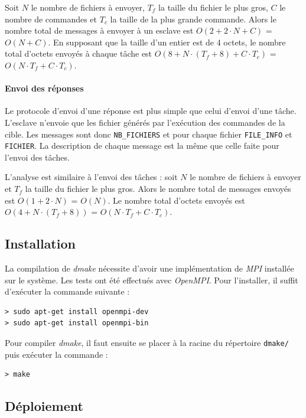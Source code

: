 \documentclass[a4paper,12pt,twoside]{article}
\begin{document}
Soit \texttt{$N$} le nombre de fichiers à envoyer, \texttt{$T_f$} la
taille du fichier le plus gros, \texttt{$C$} le nombre de commandes et
\texttt{$T_c$} la taille de la plus grande commande. Alors le nombre
total de messages à envoyer à un esclave est \texttt{$O(2 + 2 \cdot N
  + C)$} = \texttt{$O(N + C)$}. En supposant que la taille d'un entier
est de 4 octets, le nombre total d'octets envoyés à chaque tâche est
\texttt{$O(8 + N \cdot (T_f+8) + C \cdot T_c)$} = \texttt{$O(N \cdot
  T_f + C \cdot T_c)$}. 

\paragraph{Envoi des réponses}
Le protocole d'envoi d'une réponse est plus simple que celui d'envoi
d'une tâche. L'esclave n'envoie que les fichier générés par
l'exécution des commandes de la cible. Les messages sont donc
\texttt{NB\_FICHIERS} et pour chaque fichier \texttt{FILE\_INFO} et
\texttt{FICHIER}. La description de chaque message est la même que
celle faite pour l'envoi des tâches. 

L'analyse est similaire à l'envoi des tâches : soit \texttt{$N$} le
nombre de fichiers à envoyer et \texttt{$T_f$} la taille du fichier le
plus gros. Alors le nombre total de messages envoyés est \texttt{$O(1
  + 2 \cdot N)$} = \texttt{$O(N)$}. Le nombre total d'octets envoyés
est \texttt{$O(4 + N \cdot (T_f+8))$} = \texttt{$O(N \cdot T_f + C
  \cdot T_c)$}. 

\subsection{Installation}

La compilation de \emph{dmake} nécessite d'avoir une implémentation de
\emph{MPI} installée sur le système.
Les tests ont été effectués avec \emph{OpenMPI}. Pour l'installer, il
suffit d'exécuter la commande suivante :
\begin{verbatim}
> sudo apt-get install openmpi-dev
> sudo apt-get install openmpi-bin
\end{verbatim}

Pour compiler \emph{dmake}, il faut ensuite se placer à la racine du
répertoire \texttt{dmake/} puis exécuter la commande :
\begin{verbatim}
> make
\end{verbatim}

\subsection{Déploiement}
\end{document}
